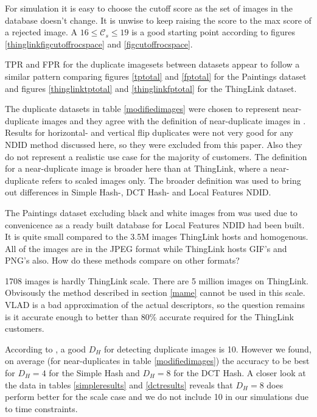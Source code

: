 \documentclass[english,12pt,a4paper,pdftex,elec,utf8, table]{aaltothesis}
\begin{document}
For simulation it is easy to choose the cutoff score as the set of images in the database doesn't change. It is unwise to keep raising the score to the max score of a rejected image. A $16 \leq \mathcal{C}_s \leq19$ is a good starting point according to figures \ref{thinglinkfigcutoffrocspace} and \ref{figcutoffrocspace}.

TPR and FPR for the duplicate imagesets between datasets appear to follow a similar pattern comparing figures \ref{tptotal} and \ref{fptotal} for the Paintings dataset and figures \ref{thinglinktptotal} and \ref{thinglinkfptotal} for the ThingLink dataset.





The duplicate datasets in table \ref{modifiedimages} were chosen to represent near-duplicate images and they agree with the definition of near-duplicate images in \cite{Wang2013}. Results for horizontal- and vertical flip duplicates were not very good for any NDID method discussed here, so they were excluded from this paper. Also they do not represent a realistic use case for the majority of customers. The definition for a near-duplicate image is broader here than at ThingLink, where a near-duplicate refers to scaled images only. The broader definition was used to bring out differences in Simple Hash-, DCT Hash- and Local Features NDID.

The Paintings dataset excluding black and white images from \cite{Vedaldi2012} was used due to convenicence as a ready built database for Local Features NDID had been built. It is quite small compared to the 3.5M images ThingLink hosts and homogenous. All of the images are in the JPEG format while ThingLink hosts GIF's and PNG's also. How do these methods compare on other formats?

1708 images is hardly ThingLink scale. There are 5 million images on ThingLink. Obvisously the method described in section \ref{mame} cannot be used in this scale. VLAD is a bad approximation of the actual descriptors, so the question remains is it accurate enough to better than 80\% accurate required for the ThingLink customers.

According to \cite{Zauner2010}, a good $D_H$ for detecting duplicate images is 10. However we found, on average (for near-duplicates in table \ref{modifiedimages}) the accuracy to be best for $D_H = 4$ for the Simple Hash and $D_H = 8$ for the DCT Hash. A closer look at the data in tables \ref{simpleresults} and \ref{dctresults} reveals that $D_H = 8$ does perform better for the scale case and we do not include 10 in our simulations due to time constraints.
\end{document}
